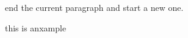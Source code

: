 \documentclass[varwidth,border=10pt]{standalone}
\begin{document}
    end the current paragraph and start a new one.
    
    this is anxample\par
    
\end{document}
